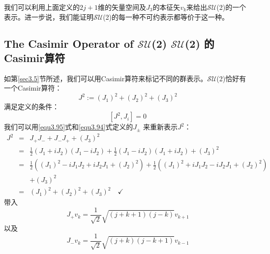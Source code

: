 我们可以利用上面定义的$2j+1$维的矢量空间及$J_3$的本征矢$v_k$来给出$\mathcal{SU}$(2)的一个表示。进一步说，我们能证明$\mathcal{SU}$(2)的每一种不可约表示都等价于这一种。

\subsection[$\mathcal{SU}$(2)的 Casimir算符]{The Casimir Operator of $\mathcal{SU}$(2)  $\mathcal{SU}$(2) 的 Casimir算符}
\label{sec3.6.2}
如第\ref{sec3.5}节所述，我们可以用Casimir算符来标记不同的群表示。$\mathcal{SU}$(2)恰好有一个Casimir算符：
\begin{equation}\label{equ3.107}
  J^2:=(J_1)^2+(J_2)^2+(J_3)^2
\end{equation}
满足定义的条件：
\begin{equation}\label{equ3.108}
  [J^2,J_i]=0
\end{equation}
我们可以用\eqref{equ3.95}式和\eqref{equ3.94}式定义的$J_\pm$ 来重新表示$J^2$：
\begin{eqnarray}
\nonumber  J^2 &=&J_+J_- + J_-J_+ +(J_3)^2\\
\nonumber      &=& \frac{1}{2}(J_1+iJ_2)(J_1-iJ_2)+\frac{1}{2}(J_1-iJ_2)(J_1+iJ_2)+(J_3)^2   \\
\nonumber      &=& \frac{1}{2}((J_1)^2-iJ_1J_2+iJ_2J_1+(J_2)^2)+\frac{1}{2}((J_1)^2+iJ_1J_2-iJ_2J_1+(J_2)^2)\\
\nonumber      &&+(J_3)^2 \\
\label{equ3.109}
               &=& (J_1)^2+(J_2)^2+(J_3)^2 \quad \checkmark
\end{eqnarray}
带入
\begin{equation}\label{equ3.110}
  J_+v_k=\frac{1}{\sqrt{2}}\sqrt{(j+k+1)(j-k)} v_{k+1}
\end{equation}
以及
\begin{equation}\label{equ3.111}
  J_-v_k=\frac{1}{\sqrt{2}}\sqrt{(j+k)(j-k+1)} v_{k-1}
\end{equation}
